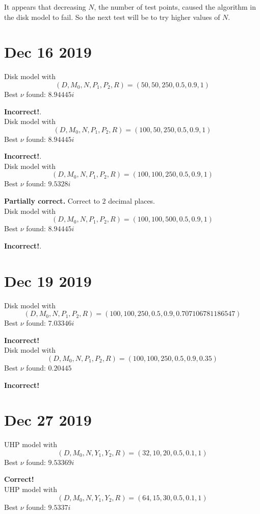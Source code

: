 \documentclass[]{article}
\begin{document}
It appears that decreasing $N$, the number of test points, caused the algorithm in the disk model to fail.
So the next test will be to try higher values of $N$.

\section*{Dec 16 2019}

Disk model with
$$
(D, M_0, N, P_1, P_2, R) =
( 50,50,250,0.5,0.9,1 )
$$
Best $\nu$ found: $8.94445i$

\textbf{Incorrect!}.
\\

Disk model with
$$
(D, M_0, N, P_1, P_2, R) =
( 100,50,250,0.5,0.9,1 )
$$
Best $\nu$ found: $8.94445i$

\textbf{Incorrect!}.
\\

Disk model with
$$
(D, M_0, N, P_1, P_2, R) =
( 100,100,250,0.5,0.9,1 )
$$
Best $\nu$ found: $9.5328i$

\textbf{Partially correct.} Correct to $2$ decimal places.
\\

Disk model with
$$
(D, M_0, N, P_1, P_2, R) =
( 100,100,500,0.5,0.9,1 )
$$
Best $\nu$ found: $8.94445i$

\textbf{Incorrect!}.

\section*{Dec 19 2019}

Disk model with
$$
(D, M_0, N, P_1, P_2, R) =
( 100,100,250,0.5,0.9,0.707106781186547 )
$$
Best $\nu$ found: $7.03346i$

\textbf{Incorrect!}
\\

Disk model with
$$
(D, M_0, N, P_1, P_2, R) =
( 100,100,250,0.5,0.9,0.35 )
$$
Best $\nu$ found: $0.20445$

\textbf{Incorrect!}

\section*{Dec 27 2019}

UHP model with
$$
(D, M_0, N, Y_1, Y_2, R) =
( 32,10,20,0.5,0.1,1 )
$$
Best $\nu$ found: $9.53369i$

\textbf{Correct!}
\\

UHP model with
$$
(D, M_0, N, Y_1, Y_2, R) =
( 64,15,30,0.5,0.1,1 )
$$
Best $\nu$ found: $9.5337i$
\end{document}
